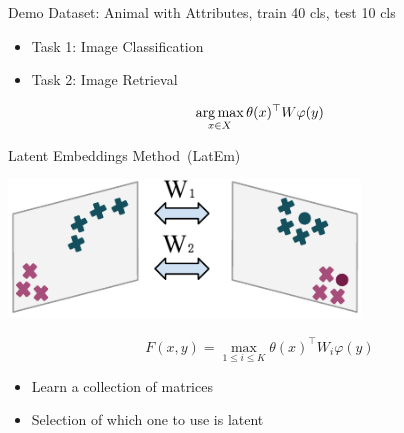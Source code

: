 \documentclass[mathserif, xcolor=table]{beamer}
\def\argmax{\mathop{\rm arg\,max}\limits}%
\begin{document}
\begin{frame}{Demo}
Dataset: Animal with Attributes, train 40 cls, test 10 cls
\begin{itemize}
\item Task 1: Image Classification
\item Task 2: Image Retrieval
\end{itemize}

\begin{equation*}
	\argmax_{x\in X} \theta(x)^\top W \varphi(y) 
\end{equation*}

\end{frame}



\begin{frame}{Latent Embeddings Method~(LatEm)}
\vspace{-4mm}
\begin{center}
\includegraphics[width=0.7\textwidth]{Latem}
\end{center}
\vspace{-4mm}
\begin{equation*}
F(x,y) = \max_{1\leq i \leq K} \theta(x)^\top W_i \varphi(y)
\end{equation*}
\pause

\begin{itemize}
	\item Learn a collection of matrices
	\item Selection of which one to use is latent
\end{itemize}

\end{frame}
\end{document}
